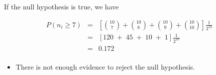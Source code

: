 \documentclass[a4paper,12pt]{article}
\begin{document}
	If the null hypothesis is true, we have
	
	
	
	\begin{eqnarray*}
		P( n_i \geq 7) &=& \left[ {10 \choose 7} +  {10 \choose 8} +  {10 \choose 9} +  {10 \choose 10} \right] \frac{1}{2^{10}}\\
		&=& \left[ 120 \;+\; 45 \;+\; 10 \;+\; 1 \right] \frac{1}{2^{10}}\\
		&=& 0.172\\
	\end{eqnarray*}
	\begin{itemize}
		\item 
		There is not enough evidence to reject the null hypothesis.
		
	\end{itemize}
	
	
	\newpage
\end{document}
